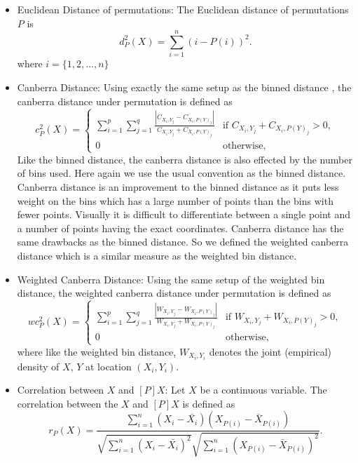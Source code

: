 \begin{itemize}


\item Euclidean Distance of permutations: The Euclidean distance of permutations $P$ is 
\[
d^2_P(X) = \sum_{i=1}^n ( i - P(i))^2.
\]
where $i = \{1, 2, ..., n\}$


\item Canberra Distance: Using exactly the same setup as the binned distance , the canberra distance under permutation is defined as
\[
c^2_P(X)  = \left \{ 
\begin{array}{ll}
\sum_{i=1}^p \sum_{j=1}^q \frac{ |C_{X_i,Y_j} - C_{X_i,P(Y)_j}|}{ C_{X_i,Y_j} + C_{X_i,P(Y)_j}} & \text{if } C_{X_i,Y_j} + C_{X_i,P(Y)_j} > 0,\\
0 & \text{otherwise},
\end{array} \right.
\]
Like the binned distance, the canberra distance is also effected by the number of bins used. Here again we use the usual convention as the binned distance. Canberra distance is an improvement to the binned distance as it puts less weight on the bins which has a large number of points than the bins with fewer points. Visually it is difficult to differentiate between a single point and a number of points having the exact coordinates. Canberra distance has the same drawbacks as the binned distance. So we defined the weighted canberra distance which is a similar measure as the weighted bin distance.

\item Weighted Canberra Distance:  Using the same setup of the weighted bin distance, the weighted canberra distance under permutation is defined as 
\[
wc_P^2(X) = \left \{ 
\begin{array}{ll}
\sum_{i=1}^p \sum_{j=1}^q \frac{ |W_{X_i,Y_j} - W_{X_i,P(Y)_j}|}{ W_{X_i,Y_j} + W_{X_i,P(Y)_j}} & \text{if } W_{X_i,Y_j} + W_{X_i,P(Y)_j} > 0,\\
0 & \text{otherwise},
\end{array} \right.
\] 
where like the weighted bin distance, $W_{X_i,Y_i}$ denotes the joint (empirical) density of $X$, $Y$ at location $(X_i, Y_i)$. 

\item Correlation between $X$ and $[P]X$: Let $X$ be a continuous variable. The correlation between the $X$ and $[P]X$ is defined as
\[
r_P(X) = \frac{ \sum_{i=1}^n (X_i - \bar{X_i})(X_{P(i)} - \bar{X}_{P(i)})}{\sqrt{\sum_{i=1}^n (X_i - \bar{X_i})^2}\sqrt{\sum_{i=1}^n (X_{P(i)}- \bar{X}_{P(i)})^2}}.
\]


\end{itemize}
